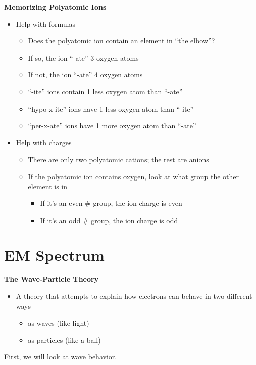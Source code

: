 \documentclass[../hchem.tex]{subfiles}
\begin{document}
\textbf{Memorizing Polyatomic Ions}
\begin{itemize}
    \item Help with formulas
    \begin{itemize}
        \item Does the polyatomic ion contain an element in ``the elbow''?
        \item If so, the ion ``-ate'' 3 oxygen atoms 
        \item If not, the ion ``-ate'' 4 oxygen atoms 
        \item ``-ite'' ions contain 1 less oxygen atom than ``-ate''
        \item ``hypo-x-ite'' ions have 1 less oxygen atom than ``-ite''
        \item ``per-x-ate'' ions have 1 more oxygen atom than ``-ate''
    \end{itemize}
    \item Help with charges 
    \begin{itemize}
        \item There are only two polyatomic cations; the rest are anions 
        \item If the polyatomic ion contains oxygen, look at what group the other element is in 
        \begin{itemize}
            \item If it's an even \# group, the ion charge is even 
            \item If it's an odd \# group, the ion charge is odd 
        \end{itemize}
    \end{itemize}
\end{itemize}

\section{EM Spectrum}
\textbf{The Wave-Particle Theory}
\begin{itemize}
    \item A theory that attempts to explain how electrons can behave in two different ways
    \begin{itemize}
        \item as waves (like light)
        \item as particles (like a ball)
    \end{itemize}
\end{itemize}

First, we will look at wave behavior.
\end{document}
